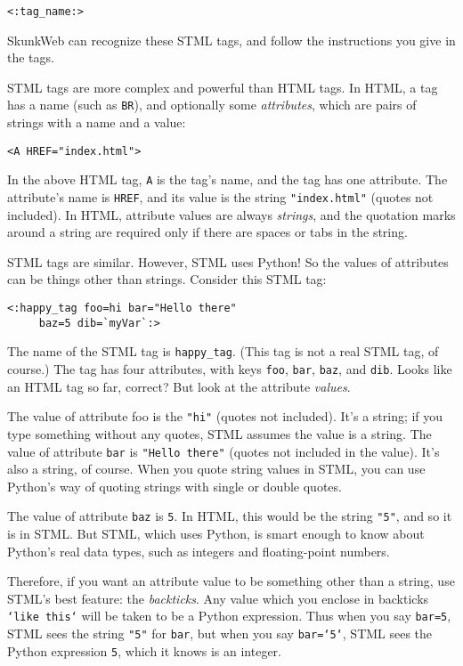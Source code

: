 \documentclass{manual}
\begin{document}
\begin{verbatim}
<:tag_name:>
\end{verbatim}


SkunkWeb can recognize these STML tags, and follow the instructions
you give in the tags.

STML tags are more complex and powerful than HTML tags. 
In HTML, a tag has a name (such as \texttt{BR}), 
and optionally some \emph{attributes}, which are pairs 
of strings with a name and a value:

\begin{verbatim}
<A HREF="index.html">
\end{verbatim}


In the above HTML tag, \texttt{A} is the tag's name, 
and the tag has one attribute. The attribute's name is 
\texttt{HREF}, and its value is the string \texttt{"index.html"} 
(quotes not included). In HTML, attribute values are always 
\emph{strings}, and the quotation marks around a string
are required only if there are spaces or tabs in the string.

STML tags are similar. However, STML uses Python! 
So the values of attributes can be things other than strings. 
Consider this STML tag:

\begin{verbatim}
<:happy_tag foo=hi bar="Hello there" 
     baz=5 dib=`myVar`:>
\end{verbatim}

The name of the STML tag is \texttt{happy_tag}. 
(This tag is not a real STML tag, of course.) 
The tag has four attributes, with keys \texttt{foo}, 
\texttt{bar}, \texttt{baz}, and \texttt{dib}. 
Looks like an HTML tag so far, correct? 
But look at the attribute \emph{values}.

The value of attribute foo is the \texttt{"hi"} 
(quotes not included). It's a string; if you type something 
without any quotes, STML assumes the value is a string.
The value of attribute \texttt{bar} is \texttt{"Hello there"} 
(quotes not included in the value). It's also a string, 
of course. When you quote string values in STML, 
you can use Python's way of quoting strings with single 
or double quotes.

The value of attribute \texttt{baz} is \texttt{5}. 
In HTML, this would be the string \texttt{"5"}, and so it 
is in STML. But STML, which uses Python, is smart enough 
to know about Python's real data types, such as integers 
and floating-point numbers.

Therefore, if you want an attribute value to be 
something other than a string, use STML's best feature: 
the \emph{backticks}. Any value which you enclose in backticks 
\texttt{`like this`} will be taken to be a Python expression. 
Thus when you say \texttt{bar=5}, STML sees the string \texttt{"5"} 
for \texttt{bar}, but when you say \texttt{bar=`5`}, STML sees 
the Python expression \texttt{5}, which it knows is an integer.
\end{document}
